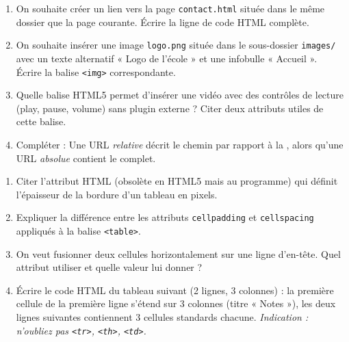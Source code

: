 \documentclass[11pt]{article}
\begin{document}
\begin{exercice}
\begin{enumerate}
    \item On souhaite créer un lien vers la page \texttt{contact.html} située dans le même dossier que la page courante. Écrire la ligne de code HTML complète.
    \item On souhaite insérer une image \texttt{logo.png} située dans le sous-dossier \texttt{images/} avec un texte alternatif « Logo de l'école » et une infobulle « Accueil ». Écrire la balise \texttt{<img>} correspondante.
    \item Quelle balise HTML5 permet d'insérer une vidéo avec des contrôles de lecture (play, pause, volume) sans plugin externe ? Citer deux attributs utiles de cette balise.
    \item Compléter : Une URL \textit{relative} décrit le chemin par rapport à la \underline{\hspace{3cm}}, alors qu'une URL \textit{absolue} contient le \underline{\hspace{3cm}} complet.
\end{enumerate}
\end{exercice}

\begin{exercice}
\begin{enumerate}
    \item Citer l'attribut HTML (obsolète en HTML5 mais au programme) qui définit l'épaisseur de la bordure d'un tableau en pixels.
    \item Expliquer la différence entre les attributs \texttt{cellpadding} et \texttt{cellspacing} appliqués à la balise \texttt{<table>}.
    \item On veut fusionner deux cellules horizontalement sur une ligne d'en-tête. Quel attribut utiliser et quelle valeur lui donner ?
    \item Écrire le code HTML du tableau suivant (2 lignes, 3 colonnes) : la première cellule de la première ligne s'étend sur 3 colonnes (titre « Notes »), les deux lignes suivantes contiennent 3 cellules standards chacune. \textit{Indication : n'oubliez pas \texttt{<tr>}, \texttt{<th>}, \texttt{<td>}.}
\end{enumerate}
\end{exercice}
\end{document}
